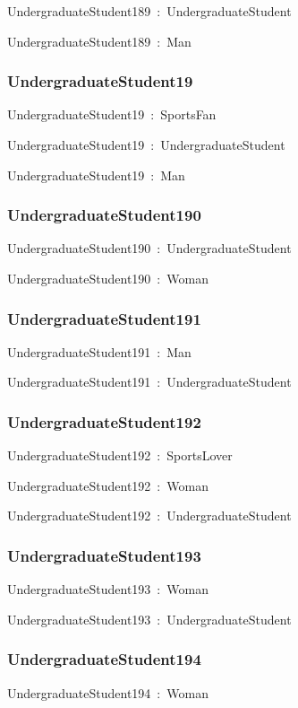\documentclass{article}
\begin{document}
UndergraduateStudent189~:~UndergraduateStudent

UndergraduateStudent189~:~Man

\subsubsection*{UndergraduateStudent19}

UndergraduateStudent19~:~SportsFan

UndergraduateStudent19~:~UndergraduateStudent

UndergraduateStudent19~:~Man

\subsubsection*{UndergraduateStudent190}

UndergraduateStudent190~:~UndergraduateStudent

UndergraduateStudent190~:~Woman

\subsubsection*{UndergraduateStudent191}

UndergraduateStudent191~:~Man

UndergraduateStudent191~:~UndergraduateStudent

\subsubsection*{UndergraduateStudent192}

UndergraduateStudent192~:~SportsLover

UndergraduateStudent192~:~Woman

UndergraduateStudent192~:~UndergraduateStudent

\subsubsection*{UndergraduateStudent193}

UndergraduateStudent193~:~Woman

UndergraduateStudent193~:~UndergraduateStudent

\subsubsection*{UndergraduateStudent194}

UndergraduateStudent194~:~Woman
\end{document}
